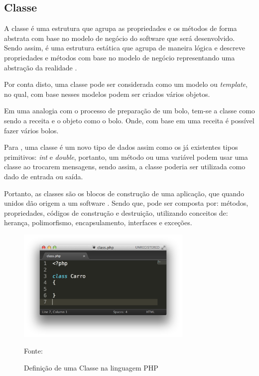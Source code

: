 \subsection{Classe}

A classe é uma estrutura que agrupa as propriedades e os métodos de forma
abstrata com base no modelo de negócio do software que será desenvolvido.
Sendo assim, é uma estrutura estática que agrupa de maneira lógica e descreve
propriedades e métodos com base no modelo de negócio representando uma abstração
da realidade \cite{phpProgramandoComOrientacaoAObjetos}.

Por conta disto, uma classe pode ser considerada como um modelo ou
\textit{template}, no qual, com base nesses modelos podem ser criados vários objetos.

Em uma analogia com o processo de preparação de um bolo, tem-se a classe como
sendo a receita e o objeto como o bolo. Onde, com base em uma receita é possível
fazer vários bolos.

Para , uma classe é um novo tipo de dados assim como os já
existentes tipos primitivos: \textit{int} e \textit{double}, portanto, um método
ou uma variável podem usar uma classe ao trocarem mensagens, sendo assim, a
classe poderia ser utilizada como dado de entrada ou saída.

Portanto, as classes são os blocos de construção de uma aplicação, que quando
unidos dão origem a um software \cite{learningJava}. Sendo que, pode ser
composta por: métodos, propriedades, códigos de construção e destruição,
utilizando conceitos de: herança, polimorfismo, encapsulamento, interfaces e
exceções.

\begin{figure}[h!tb]
	\caption{Definição de uma Classe na linguagem PHP}
	\label{fig:classe}

	\centering
	\includegraphics[width=0.75\textwidth]{images/class.png}

	\centering
	\footnotesize Fonte: \fonteOAutor
\end{figure}

